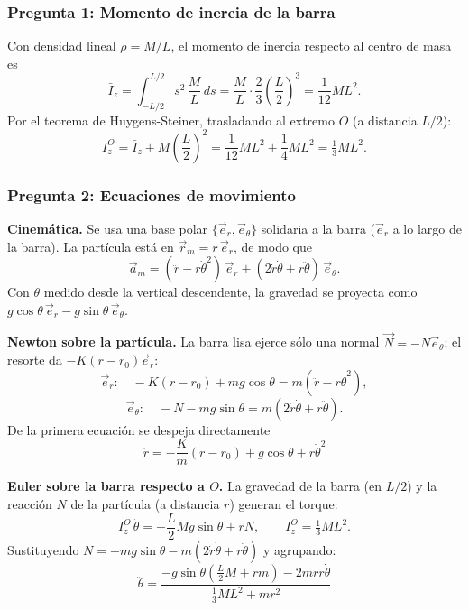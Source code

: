 \begin{sol}

\subsubsection*{Pregunta 1: Momento de inercia de la barra}

Con densidad lineal $\rho=M/L$, el momento de inercia respecto al centro de masa es
$$\bar{I}_z = \int_{-L/2}^{L/2} s^2\,\frac{M}{L}\,ds = \frac{M}{L}\cdot\frac{2}{3}\left(\frac{L}{2}\right)^3 = \frac{1}{12}ML^2.$$
Por el teorema de Huygens-Steiner, trasladando al extremo $O$ (a distancia $L/2$):
$$I_z^O = \bar{I}_z + M\left(\frac{L}{2}\right)^2 = \frac{1}{12}ML^2 + \frac{1}{4}ML^2 = \boxed{\tfrac13 ML^2}.$$

\subsubsection*{Pregunta 2: Ecuaciones de movimiento}

\textbf{Cinemática.} Se usa una base polar $\{\vec{e}_r,\vec{e}_\theta\}$ solidaria a la barra
($\vec{e}_r$ a lo largo de la barra). La partícula está en $\vec{r}_m=r\,\vec{e}_r$, de modo que
$$\vec{a}_m = (\ddot{r}-r\dot\theta^2)\,\vec{e}_r + (2\dot{r}\dot\theta + r\ddot\theta)\,\vec{e}_\theta.$$
Con $\theta$ medido desde la vertical descendente, la gravedad se proyecta como
$g\cos\theta\,\vec{e}_r - g\sin\theta\,\vec{e}_\theta$.

\textbf{Newton sobre la partícula.} La barra lisa ejerce sólo una normal $\vec{N}=-N\vec{e}_\theta$;
el resorte da $-K(r-r_0)\vec{e}_r$:
$$\vec{e}_r:\quad -K(r-r_0) + mg\cos\theta = m(\ddot{r}-r\dot\theta^2),$$
$$\vec{e}_\theta:\quad -N - mg\sin\theta = m(2\dot{r}\dot\theta + r\ddot\theta).$$
De la primera ecuación se despeja directamente
$$\boxed{\;\ddot{r} = -\frac{K}{m}(r-r_0) + g\cos\theta + r\dot\theta^2\;}$$

\textbf{Euler sobre la barra respecto a $O$.} La gravedad de la barra (en $L/2$) y la reacción
$N$ de la partícula (a distancia $r$) generan el torque:
$$I_z^O\,\ddot\theta = -\frac{L}{2}Mg\sin\theta + rN,\qquad I_z^O=\tfrac13 ML^2.$$
Sustituyendo $N = -mg\sin\theta - m(2\dot{r}\dot\theta + r\ddot\theta)$ y agrupando:
$$\boxed{\;\ddot\theta = \frac{-g\sin\theta\left(\tfrac{L}{2}M + rm\right) - 2mr\dot{r}\dot\theta}{\tfrac13 ML^2 + mr^2}\;}$$

\end{sol}
